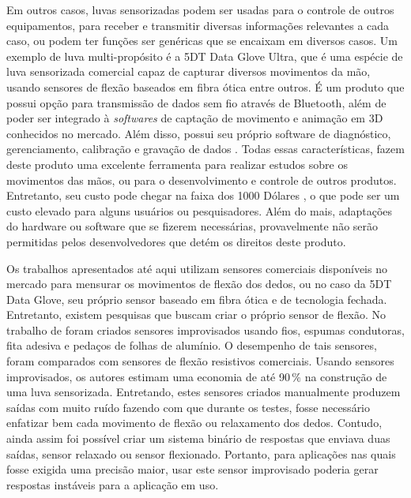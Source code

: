 \documentclass[
	12pt,				%
	openright,			%
	oneside,			%
	a4paper,			%
	english,			%
	brazil				%
	]{abntex2}
\begin{document}
		
		
		Em outros casos, luvas sensorizadas podem ser usadas para o controle de outros equipamentos, para receber e transmitir diversas informações relevantes a cada caso, ou podem ter funções ser genéricas que se encaixam em diversos casos. Um exemplo de luva multi-propósito é a 5DT Data Glove Ultra, que é uma espécie de luva sensorizada comercial capaz de capturar diversos movimentos da mão, usando sensores de flexão baseados em fibra ótica entre outros. É um produto que possui opção para transmissão de dados sem fio através de Bluetooth, além de poder ser integrado à \textit{softwares} de captação de movimento e animação em 3D conhecidos no mercado. Além disso, possui seu próprio software de diagnóstico, gerenciamento, calibração e gravação de dados \cite{5DT-ultra}. Todas essas características, fazem deste produto uma excelente ferramenta para realizar estudos sobre os movimentos das mãos, ou para o desenvolvimento e controle de outros produtos. Entretanto, seu custo pode chegar na faixa dos 1000 Dólares \cite{5DT-glove2019ebay}, o que pode ser um custo elevado para alguns usuários ou pesquisadores. Além do mais, adaptações do hardware ou software que se fizerem necessárias, provavelmente não serão permitidas pelos desenvolvedores que detém os direitos deste produto.

		Os trabalhos apresentados até aqui utilizam sensores comerciais disponíveis no mercado para mensurar os movimentos de flexão dos dedos, ou no caso da 5DT Data Glove, seu próprio sensor baseado em fibra ótica e de tecnologia fechada. Entretanto, existem pesquisas que buscam criar o próprio sensor de flexão. No trabalho de \cite{flores2014glovecontroller} foram criados sensores improvisados usando fios, espumas condutoras, fita adesiva e pedaços de folhas de alumínio. O desempenho de tais sensores, foram comparados com sensores de flexão resistivos comerciais. Usando sensores improvisados, os autores estimam uma economia de até 90$\,\%$ na construção de uma luva sensorizada. Entretando, estes sensores criados manualmente produzem saídas com muito ruído fazendo com que durante os testes, fosse necessário enfatizar bem cada movimento de flexão ou relaxamento dos dedos. Contudo, ainda assim foi possível criar um sistema binário de respostas que enviava duas saídas, sensor relaxado ou sensor flexionado. Portanto, para aplicações nas quais fosse exigida uma precisão maior, usar este sensor improvisado poderia gerar respostas instáveis para a aplicação em uso.


\end{document}

